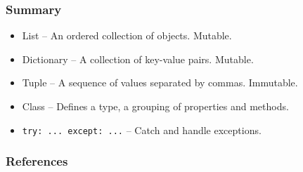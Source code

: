 \documentclass{beamer}
\begin{document}
\begin{frame}[fragile]
\frametitle{Summary}
\begin{itemize}
\item List -- An ordered collection of objects. Mutable.
\item Dictionary -- A collection of key-value pairs. Mutable.
\item Tuple -- A sequence of values separated by commas. Immutable.
\item Class -- Defines a type, a grouping of properties and methods.
\item \lstinline{try: ... except: ...} -- Catch and handle exceptions.
\end{itemize}
\end{frame}

\begin{frame}%
  \frametitle{References}
  
  \scriptsize
  
\end{frame}
\end{document}
